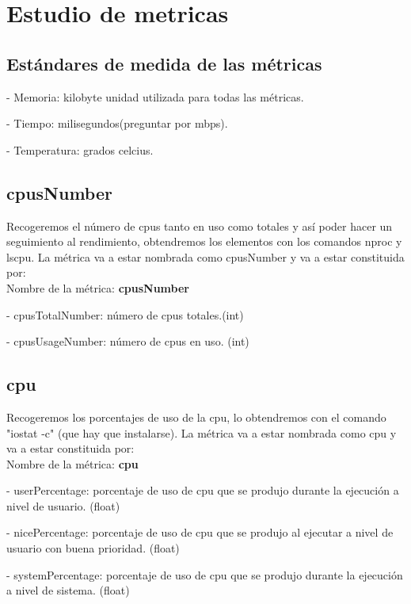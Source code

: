 \documentclass[ spanish, a4paper, 12pt, twoside]{report}
\begin{document}
\chapter{Estudio de metricas}

\section{Estándares de medida de las métricas}

\hyp{} Memoria: kilobyte unidad utilizada para todas las métricas.

\hyp{} Tiempo: milisegundos(preguntar por mbps).

\hyp{} Temperatura: grados celcius.

\section{cpusNumber}
Recogeremos el número de cpus tanto en uso como totales y así poder hacer un seguimiento al rendimiento, obtendremos los elementos con 
los comandos nproc y lscpu. La métrica va a estar nombrada como cpusNumber y va a estar constituida por:\\

Nombre de la métrica: \textbf{cpusNumber}

\hyp{} cpusTotalNumber: número de cpus totales.(int)

\hyp{} cpusUsageNumber: número de cpus en uso. (int)

\section{cpu}
Recogeremos los porcentajes de uso de la cpu, lo obtendremos con el comando "iostat -c" (que hay que instalarse). 
La métrica va a estar nombrada como cpu y va a estar constituida por:\\

Nombre de la métrica: \textbf{cpu}

\hyp{} userPercentage: porcentaje de uso de cpu que se produjo durante la ejecución a nivel de usuario. (float)

\hyp{} nicePercentage: porcentaje de uso de cpu que se produjo al ejecutar a nivel de usuario con buena prioridad. (float)

\hyp{} systemPercentage: porcentaje de uso de cpu que se produjo durante la ejecución a nivel de sistema. (float) 
\end{document}
